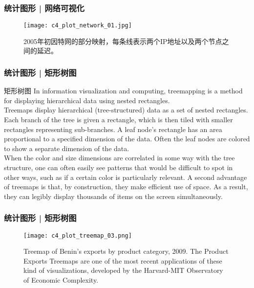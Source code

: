 \begin{frame}
  \frametitle{统计图形 | 网络可视化}
  \begin{figure}
    \centering
    \texttt{[image: c4\_plot\_network\_01.jpg]}
    \caption{{\footnotesize 2005年初因特网的部分映射，每条线表示两个IP地址以及两个节点之间的延迟。}}
  \end{figure}
\end{frame}

\begin{frame}
  \frametitle{统计图形 | 矩形树图}
  \begin{block}{矩形树图}
    In information visualization and computing, treemapping is a method for displaying hierarchical data using nested rectangles.\\
    \vspace{0.5em}
Treemaps display hierarchical (tree-structured) data as a set of nested rectangles. Each branch of the tree is given a rectangle, which is then tiled with smaller rectangles representing sub-branches. A leaf node's rectangle has an area proportional to a specified dimension of the data. Often the leaf nodes are colored to show a separate dimension of the data.\\
\vspace{0.5em}
When the color and size dimensions are correlated in some way with the tree structure, one can often easily see patterns that would be difficult to spot in other ways, such as if a certain color is particularly relevant. A second advantage of treemaps is that, by construction, they make efficient use of space. As a result, they can legibly display thousands of items on the screen simultaneously.
  \end{block}
\end{frame}

\begin{frame}
  \frametitle{统计图形 | 矩形树图}
  \begin{figure}
    \centering
    \texttt{[image: c4\_plot\_treemap\_03.png]}
    \caption{{\footnotesize Treemap of Benin's exports by product category, 2009. The Product Exports Treemaps are one of the most recent applications of these kind of visualizations, developed by the Harvard-MIT Observatory of Economic Complexity.}}
  \end{figure}
\end{frame}


